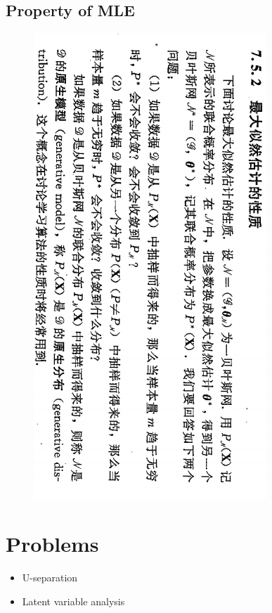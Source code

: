 \documentclass{article}
\begin{document}
\subsection{Property of MLE}
\begin{figure}[h]
    \centering
    \includegraphics[width=1.05\columnwidth]{figs/mle_property.png}
\end{figure}

\section{Problems}
\begin{itemize}
    \item U-separation
    \item Latent variable analysis
\end{itemize}
\end{document}
